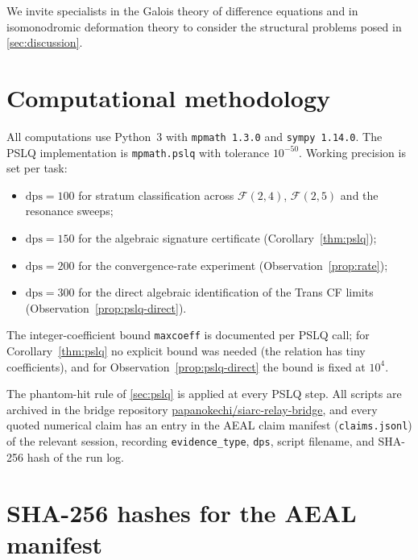 \documentclass[11pt]{amsart}
\theoremstyle{definition}
\theoremstyle{remark}
\newcommand{\FF}{\mathcal{F}}
\newcommand{\dps}{\mathrm{dps}}
\begin{document}
We invite specialists in the Galois theory of difference equations
and in isomonodromic deformation theory to consider the structural
problems posed in \textsection\ref{sec:discussion}.

\appendix
\section{Computational methodology}\label{app:methods}

All computations use Python~3 with \texttt{mpmath~1.3.0} and
\texttt{sympy~1.14.0}.  The PSLQ implementation is
\texttt{mpmath.pslq} with tolerance $10^{-50}$.  Working precision is
set per task:
\begin{itemize}[leftmargin=1.4em]
\item $\dps = 100$ for stratum classification across $\FF(2,4)$,
$\FF(2,5)$ and the resonance sweeps;
\item $\dps = 150$ for the algebraic signature certificate
(Corollary~\ref{thm:pslq});
\item $\dps = 200$ for the convergence-rate experiment
(Observation~\ref{prop:rate});
\item $\dps = 300$ for the direct algebraic identification of the
Trans CF limits (Observation~\ref{prop:pslq-direct}).
\end{itemize}
The integer-coefficient bound \texttt{maxcoeff} is documented per
PSLQ call; for Corollary~\ref{thm:pslq} no explicit bound was needed
(the relation has tiny coefficients), and for
Observation~\ref{prop:pslq-direct} the bound is fixed at $10^{4}$.

The phantom-hit rule of \textsection\ref{sec:pslq} is applied at
every PSLQ step.  All scripts are archived in the bridge repository
\href{https://github.com/papanokechi/siarc-relay-bridge}%
{papanokechi/siarc-relay-bridge}, and every quoted numerical claim
has an entry in the AEAL claim manifest (\texttt{claims.jsonl}) of
the relevant session, recording \texttt{evidence\_type}, \texttt{dps},
script filename, and SHA-256 hash of the run log.

\section{SHA-256 hashes for the AEAL manifest}\label{app:hashes}
\end{document}
